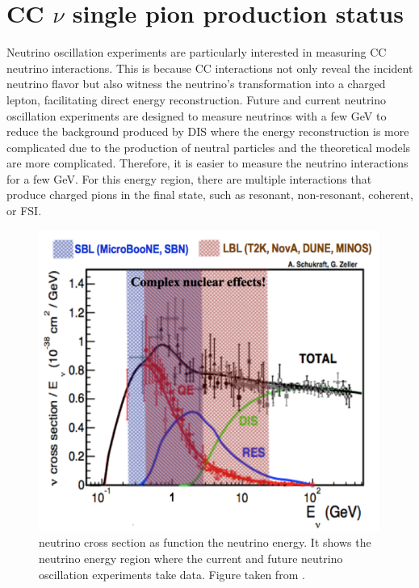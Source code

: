 \section{CC $\nu$ single pion production status}
\label{Cap:Int:Motivation}

Neutrino oscillation experiments are particularly interested in measuring CC neutrino interactions. This is because CC interactions not only reveal the incident neutrino flavor but also witness the neutrino's transformation into a charged lepton, facilitating direct energy reconstruction. Future and current neutrino oscillation experiments are designed to measure neutrinos with a few GeV to reduce the background produced by DIS where the energy reconstruction is more complicated due to the production of neutral particles and the theoretical models are more complicated. Therefore, it is easier to measure the neutrino interactions for a few GeV. For this energy region, there are multiple interactions that produce charged pions in the final state, such as resonant, non-resonant, coherent, or FSI.

 
\begin{figure}[!htb]
    \centering
    \includegraphics[scale=0.3]{Figures/Chapter1/nuXSec.png}
    \caption{neutrino cross section as function the neutrino energy. It shows the neutrino energy region where the current and future neutrino oscillation experiments take data. Figure taken from \cite{gollapinni2016neutrino}.}
    \label{fig:Int:Motivation:nuXsecl}
\end{figure}

